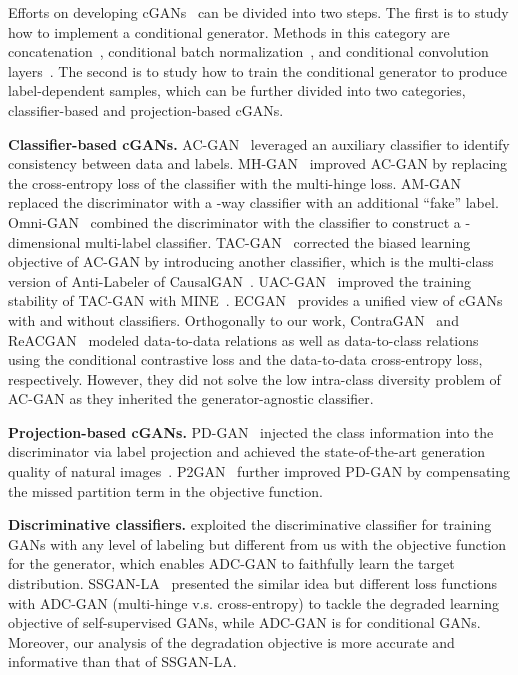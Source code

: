 \documentclass[nohyperref]{article}
\theoremstyle{plain}
\theoremstyle{definition}
\theoremstyle{remark}
\begin{document}
Efforts on developing cGANs~\cite{mirza2014conditional} can be divided into two steps.
The first is to study how to implement a conditional generator.
Methods in this category are concatenation~\cite{mirza2014conditional}, conditional batch normalization~\cite{NIPS2017_6fab6e3a}, and conditional convolution layers~\cite{sagong2019cgans}.
The second is to study how to train the conditional generator to produce label-dependent samples, which can be further divided into two categories, classifier-based and projection-based cGANs.

\textbf{Classifier-based cGANs.}
AC-GAN~\cite{pmlr-v70-odena17a} leveraged an auxiliary classifier to identify consistency between data and labels.
MH-GAN~\cite{Kavalerov_2021_WACV} improved AC-GAN by replacing the cross-entropy loss of the classifier with the multi-hinge loss.
AM-GAN~\cite{zhou2018activation} replaced the discriminator with a -way classifier with an additional ``fake'' label.
Omni-GAN~\cite{zhou2020omni} combined the discriminator with the classifier to construct a -dimensional multi-label classifier.
TAC-GAN~\cite{NEURIPS2019_4ea06fbc} corrected the biased learning objective of AC-GAN by introducing another classifier, which is the multi-class version of Anti-Labeler of CausalGAN~\cite{kocaoglu2018causalgan}.
UAC-GAN~\cite{han2020unbiased} improved the training stability of TAC-GAN with MINE~\cite{pmlr-v80-belghazi18a}.
ECGAN~\cite{chen2021a} provides a unified view of cGANs with and without classifiers.
Orthogonally to our work, ContraGAN~\cite{NEURIPS2020_f490c742} and ReACGAN~\cite{kang2021rebooting} modeled data-to-data relations as well as data-to-class relations using the conditional contrastive loss and the data-to-data cross-entropy loss, respectively.
However, they did not solve the low intra-class diversity problem of AC-GAN as they inherited the generator-agnostic classifier.


\textbf{Projection-based cGANs.}
PD-GAN~\cite{miyato2018cgans} injected the class information into the discriminator via label projection and achieved the state-of-the-art generation quality of natural images~\cite{brock2018large,wu2019logan,Zhang2020Consistency,zhao2021improved}.
P2GAN~\cite{Han_2021_ICCV} further improved PD-GAN by compensating the missed partition term in the objective function.

\textbf{Discriminative classifiers.}
\citet{pmlr-v139-watanabe21a} exploited the discriminative classifier for training GANs with any level of labeling but different from us with the objective function for the generator, which enables ADC-GAN to faithfully learn the target distribution.
SSGAN-LA~\cite{hou2021selfsupervised} presented the similar idea but different loss functions with ADC-GAN (multi-hinge v.s. cross-entropy) to tackle the degraded learning objective of self-supervised GANs, while ADC-GAN is for conditional GANs.
Moreover, our analysis of the degradation objective is more accurate and informative than that of SSGAN-LA.
\end{document}
